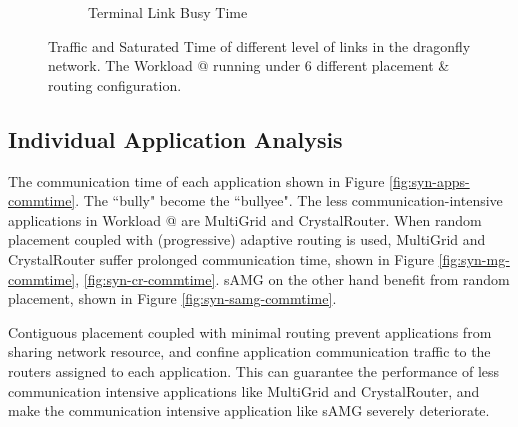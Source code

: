 \documentclass[conference,compsoc]{IEEEtran}
\makeatletter
\newcommand{\Rmnum}[1]{\expandafter\@slowromancap\romannumeral #1@}
\makeatother
\begin{document}
\begin{figure}[t]
\begin{subfigure}[t]{0.32\textwidth}
        \caption{Terminal Link Busy Time}
        \label{fig:synwkld-terminal-link-stime}
    \end{subfigure}%
   \caption{Traffic and Saturated Time of different level of links in the dragonfly network. The Workload \Rmnum{2} running under 6 different placement \& routing configuration.}
   \label{fig:synwkld-network-traffic-stime}
\end{figure}

\subsection{Individual Application Analysis}
\label{sec: workload-2 app analysis}

The communication time of each application shown in Figure \ref{fig:syn-apps-commtime}. The ``bully" become the ``bullyee". The less communication-intensive applications in Workload \Rmnum{2} are  MultiGrid and CrystalRouter.  When random placement coupled with (progressive) adaptive routing is used, MultiGrid and CrystalRouter suffer prolonged communication time, shown in Figure \ref{fig:syn-mg-commtime}, \ref{fig:syn-cr-commtime}. sAMG on the other hand benefit from random placement, shown in Figure \ref{fig:syn-samg-commtime}. 

Contiguous placement coupled with minimal routing prevent applications from sharing network resource, and confine application communication traffic to the routers assigned to each application. This can guarantee the performance of less communication intensive applications like MultiGrid and CrystalRouter, and make the communication intensive application like sAMG severely deteriorate. 
\end{document}
